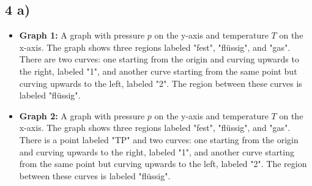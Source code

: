 \subsection*{4 a)}

\begin{itemize}
    \item \textbf{Graph 1:} A graph with pressure \( p \) on the y-axis and temperature \( T \) on the x-axis. The graph shows three regions labeled "fest", "flüssig", and "gas". There are two curves: one starting from the origin and curving upwards to the right, labeled "1", and another curve starting from the same point but curving upwards to the left, labeled "2". The region between these curves is labeled "flüssig".
    \item \textbf{Graph 2:} A graph with pressure \( p \) on the y-axis and temperature \( T \) on the x-axis. The graph shows three regions labeled "fest", "flüssig", and "gas". There is a point labeled "TP" and two curves: one starting from the origin and curving upwards to the right, labeled "1", and another curve starting from the same point but curving upwards to the left, labeled "2". The region between these curves is labeled "flüssig".
\end{itemize}